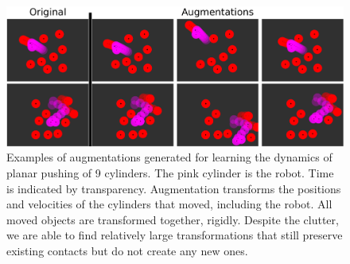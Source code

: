 \begin{figure}
    \centering
    \includegraphics[width=1\linewidth]{Chap3/images/cylinders_aug_examples.png}
    \caption{Examples of augmentations generated for learning the dynamics of planar pushing of 9 cylinders. The pink cylinder is the robot. Time is indicated by transparency. Augmentation transforms the positions and velocities of the cylinders that moved, including the robot. All moved objects are transformed together, rigidly. Despite the clutter, we are able to find relatively large transformations that still preserve existing contacts but do not create any new ones.}
    \label{RSS:fig:cylinders_aug_examples}
\end{figure}